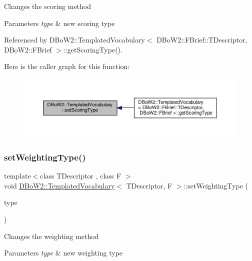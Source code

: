 Changes the scoring method 
\begin{DoxyParams}{Parameters}
{\em type} & new scoring type \\
\hline
\end{DoxyParams}


Referenced by D\+Bo\+W2\+::\+Templated\+Vocabulary$<$ D\+Bo\+W2\+::\+F\+Brief\+::\+T\+Descriptor, D\+Bo\+W2\+::\+F\+Brief $>$\+::get\+Scoring\+Type().

Here is the caller graph for this function\+:\nopagebreak
\begin{figure}[H]
\begin{center}
\leavevmode
\includegraphics[width=350pt]{classDBoW2_1_1TemplatedVocabulary_a05a6c2f46184618c9ea8368f53e6980c_icgraph}
\end{center}
\end{figure}
\mbox{\label{classDBoW2_1_1TemplatedVocabulary_aa8f63a3379debd40214899d996cfc733}} 
\subsubsection{\texorpdfstring{set\+Weighting\+Type()}{setWeightingType()}}
{\footnotesize\ttfamily template$<$class T\+Descriptor , class F $>$ \\
void \hyperlink{classDBoW2_1_1TemplatedVocabulary}{D\+Bo\+W2\+::\+Templated\+Vocabulary}$<$ T\+Descriptor, F $>$\+::set\+Weighting\+Type (\begin{DoxyParamCaption}\item[{\hyperlink{namespaceDBoW2_a5de5c8a307aca9a84ffefda2a9bc467a}{Weighting\+Type}}]{type }\end{DoxyParamCaption})\hspace{0.3cm}{\ttfamily [inline]}}

Changes the weighting method 
\begin{DoxyParams}{Parameters}
{\em type} & new weighting type \\
\hline
\end{DoxyParams}


